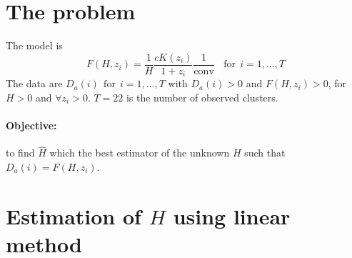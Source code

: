 \documentclass[12pt,a4paper]{article}
\begin{document}
\section{The problem}

The model is 
$$
F(H,z_i) = \frac{1}{H} \frac{c K(z_i)}{1+z_i}\frac{1}{\text{conv}}~~~~\text{for}~~i=1,...,T
$$
The data are $D_a(i)~~\text{for}~~i=1,...,T$
with $D_a(i)>0$ and $F(H,z_i)>0$, for $H>0$ and $\forall z_i>0$. $T = 22$ is the number of observed clusters.

\paragraph{Objective:} to find $\widehat{H}$ which the best estimator of the unknown $H$ such that $D_a(i) = F(H,z_i)$.

\section{Estimation of $H$ using linear method}
\end{document}
